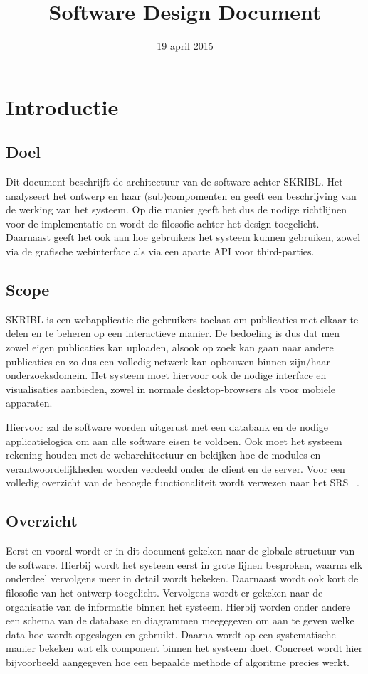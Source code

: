 \documentclass{article}
\title{Software Design Document}
\author{} %
\date{19 april 2015} %
\begin{document}




\tableofcontents
\newpage

\section{Introductie}

\subsection{Doel}

Dit document beschrijft de architectuur van de software achter SKRIBL. 
Het analyseert het ontwerp en haar (sub)compomenten en geeft een beschrijving
van de werking van het systeem. Op die manier geeft het dus de nodige richtlijnen
voor de implementatie en wordt de filosofie achter het design toegelicht.
Daarnaast geeft het ook aan hoe gebruikers het systeem kunnen gebruiken, zowel
via de grafische webinterface als via een aparte API voor third-parties.

\subsection{Scope}

SKRIBL is een webapplicatie die gebruikers toelaat om publicaties met elkaar te delen
en te beheren op een interactieve manier. De bedoeling is dus dat men zowel eigen publicaties kan uploaden, alsook op zoek kan gaan naar andere publicaties en zo dus een volledig netwerk kan opbouwen binnen zijn/haar onderzoeksdomein. Het systeem moet hiervoor ook de nodige interface en visualisaties aanbieden, zowel in normale desktop-browsers als voor mobiele apparaten.

Hiervoor zal de software worden uitgerust met een databank en de nodige applicatielogica om aan alle software eisen te voldoen. Ook moet het systeem rekening houden met de webarchitectuur en bekijken hoe de modules en verantwoordelijkheden worden verdeeld onder de client en de server. Voor een volledig overzicht van de beoogde functionaliteit wordt verwezen naar het SRS ~\cite{Xtreport:SRS}.

\subsection{Overzicht}

Eerst en vooral wordt er in dit document gekeken naar de globale structuur van de software. Hierbij wordt het systeem eerst in grote lijnen besproken, waarna elk onderdeel vervolgens meer in detail wordt bekeken. Daarnaast wordt ook kort de filosofie van het ontwerp toegelicht. 
Vervolgens wordt er gekeken naar de organisatie van de informatie binnen het systeem. Hierbij worden onder andere een schema van de database en diagrammen meegegeven om aan te geven welke data hoe wordt opgeslagen en gebruikt. 
Daarna wordt op een systematische manier bekeken wat elk component binnen het systeem doet. Concreet wordt hier bijvoorbeeld aangegeven hoe een bepaalde methode of algoritme precies werkt.
\end{document}
